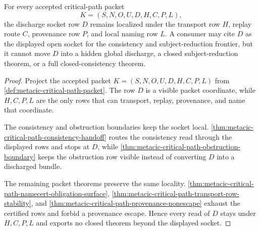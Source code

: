 \begin{theorem}
\label{thm:metacic-critical-path-discharge-socket-locality}
For every accepted critical-path packet
$$
K=(S,N,O,U,D,H,C,P,L),
$$
the discharge socket row $D$ remains localized under the transport row $H$, replay route $C$, provenance row $P$, and local naming row $L$. A consumer may cite $D$ as the displayed open socket for the consistency and subject-reduction frontier, but it cannot move $D$ into a hidden global discharge, a closed subject-reduction theorem, or a full closed-consistency theorem.
\end{theorem}
\begin{proof}
Project the accepted packet $K=(S,N,O,U,D,H,C,P,L)$ from \autoref{def:metacic-critical-path-packet}. The row $D$ is a visible packet coordinate, while $H,C,P,L$ are the only rows that can transport, replay, provenance, and name that coordinate.

The consistency and obstruction boundaries keep the socket local. \autoref{thm:metacic-critical-path-consistency-handoff} routes the consistency read through the displayed rows and stops at $D$, while \autoref{thm:metacic-critical-path-obstruction-boundary} keeps the obstruction row visible instead of converting $D$ into a discharged bundle.

The remaining packet theorems preserve the same locality. \autoref{thm:metacic-critical-path-namecert-obligation-surface}, \autoref{thm:metacic-critical-path-transport-row-stability}, and \autoref{thm:metacic-critical-path-provenance-nonescape} exhaust the certified rows and forbid a provenance escape. Hence every read of $D$ stays under $H,C,P,L$ and exports no closed theorem beyond the displayed socket.
\end{proof}

